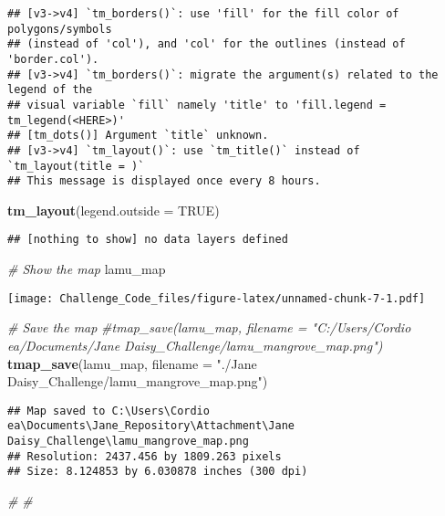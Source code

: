 \documentclass[
]{article}
\newenvironment{Shaded}{\begin{snugshade}}{\end{snugshade}}
\newcommand{\AttributeTok}[1]{\textcolor[rgb]{0.13,0.29,0.53}{#1}}
\newcommand{\CommentTok}[1]{\textcolor[rgb]{0.56,0.35,0.01}{\textit{#1}}}
\newcommand{\ConstantTok}[1]{\textcolor[rgb]{0.56,0.35,0.01}{#1}}
\newcommand{\FunctionTok}[1]{\textcolor[rgb]{0.13,0.29,0.53}{\textbf{#1}}}
\newcommand{\NormalTok}[1]{#1}
\newcommand{\StringTok}[1]{\textcolor[rgb]{0.31,0.60,0.02}{#1}}
\begin{document}
\begin{verbatim}
## [v3->v4] `tm_borders()`: use 'fill' for the fill color of polygons/symbols
## (instead of 'col'), and 'col' for the outlines (instead of 'border.col').
## [v3->v4] `tm_borders()`: migrate the argument(s) related to the legend of the
## visual variable `fill` namely 'title' to 'fill.legend = tm_legend(<HERE>)'
## [tm_dots()] Argument `title` unknown.
## [v3->v4] `tm_layout()`: use `tm_title()` instead of `tm_layout(title = )`
## This message is displayed once every 8 hours.
\end{verbatim}

\begin{Shaded}
\begin{Highlighting}[]
  \FunctionTok{tm\_layout}\NormalTok{(}\AttributeTok{legend.outside =} \ConstantTok{TRUE}\NormalTok{)}
\end{Highlighting}
\end{Shaded}

\begin{verbatim}
## [nothing to show] no data layers defined
\end{verbatim}

\begin{Shaded}
\begin{Highlighting}[]
\CommentTok{\# Show the map}
\NormalTok{lamu\_map}
\end{Highlighting}
\end{Shaded}

\texttt{[image: Challenge\_Code\_files/figure-latex/unnamed-chunk-7-1.pdf]}

\begin{Shaded}
\begin{Highlighting}[]
\CommentTok{\# Save the map}
\CommentTok{\#tmap\_save(lamu\_map, filename = "C:/Users/Cordio ea/Documents/Jane Daisy\_Challenge/lamu\_mangrove\_map.png")}
\FunctionTok{tmap\_save}\NormalTok{(lamu\_map, }\AttributeTok{filename =} \StringTok{"./Jane Daisy\_Challenge/lamu\_mangrove\_map.png"}\NormalTok{)}
\end{Highlighting}
\end{Shaded}

\begin{verbatim}
## Map saved to C:\Users\Cordio ea\Documents\Jane_Repository\Attachment\Jane Daisy_Challenge\lamu_mangrove_map.png
## Resolution: 2437.456 by 1809.263 pixels
## Size: 8.124853 by 6.030878 inches (300 dpi)
\end{verbatim}

\begin{Shaded}
\begin{Highlighting}[]
\CommentTok{\#}
\CommentTok{\#}
\end{Highlighting}
\end{Shaded}
\end{document}

